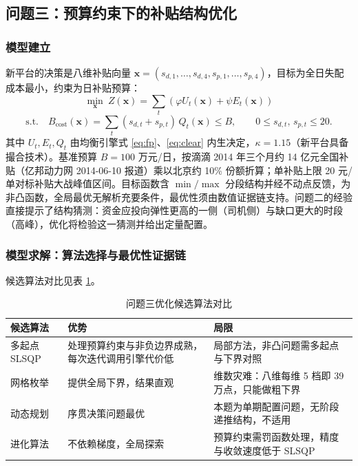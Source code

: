 \documentclass[12pt,a4paper]{ctexart}
\begin{document}
\subsection{问题三：预算约束下的补贴结构优化}

\subsubsection{模型建立}

新平台的决策是八维补贴向量 $\boldsymbol{x}=(s_{d,1},\dots,s_{d,4},s_{p,1},\dots,s_{p,4})$，目标为全日失配成本最小，约束为日补贴预算：
\begin{equation}
\min_{\boldsymbol{x}}\ Z(\boldsymbol{x})=\sum_t\left(\varphi U_t(\boldsymbol{x})+\psi E_t(\boldsymbol{x})\right) \label{eq:q3obj}
\end{equation}
\begin{equation}
\text{s.t.}\quad B_{\mathrm{cost}}(\boldsymbol{x})=\sum_t (s_{d,t}+s_{p,t})\,Q_t(\boldsymbol{x}) \le B,\qquad 0\le s_{d,t},\,s_{p,t}\le 20 . \label{eq:q3con}
\end{equation}
其中 $U_t,E_t,Q_t$ 由均衡引擎式 \eqref{eq:fp}、\eqref{eq:clear} 内生决定，$\kappa=1.15$（新平台具备撮合技术）。基准预算 $B=100$ 万元/日，按滴滴 2014 年三个月约 14 亿元全国补贴（亿邦动力网 2014-06-10 报道）乘以北京约 10\% 份额折算；单补贴上限 20 元/单对标补贴大战峰值区间。目标函数含 $\min/\max$ 分段结构并经不动点反馈，为非凸函数，全局最优无解析充要条件，最优性须由数值证据链支持。问题二的经验直接提示了结构猜测：资金应投向弹性更高的一侧（司机侧）与缺口更大的时段（高峰），优化将检验这一猜测并给出定量配置。

\subsubsection{模型求解：算法选择与最优性证据链}

候选算法对比见表 \ref{tab:algo3}。

\begin{table}[H]
\centering
\caption{问题三优化候选算法对比}
\label{tab:algo3}
\begin{tabular}{p{3.6cm}p{4.6cm}p{5.0cm}}
\toprule
候选算法 & 优势 & 局限 \\
\midrule
多起点 SLSQP & 处理预算约束与非负边界成熟，每次迭代调用引擎代价低 & 局部方法，非凸问题需多起点与下界对照 \\
网格枚举 & 提供全局下界，结果直观 & 维数灾难：八维每维 5 档即 39 万点，只能做粗下界 \\
动态规划 & 序贯决策问题最优 & 本题为单期配置问题，无阶段递推结构，不适用 \\
进化算法 & 不依赖梯度，全局探索 & 预算约束需罚函数处理，精度与收敛速度低于 SLSQP \\
\bottomrule
\end{tabular}
\end{table}
\end{document}
